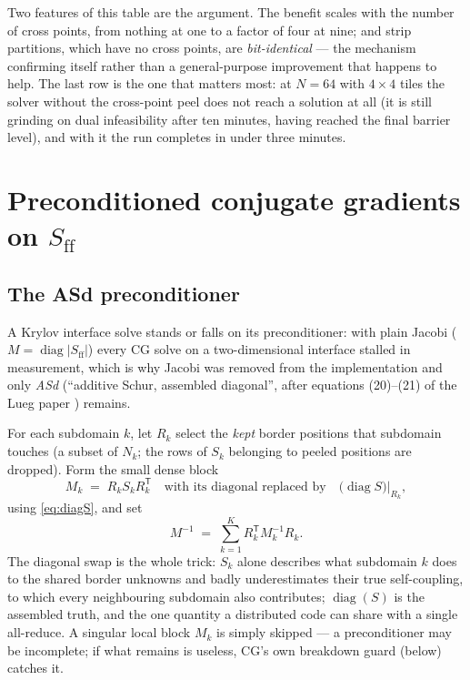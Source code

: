 \documentclass[11pt]{article}
\newcommand{\diag}{\operatorname{diag}}
\newcommand{\Sff}{S_{\mathrm{ff}}}
\begin{document}
Two features of this table are the argument.  The benefit scales with the
number of cross points, from nothing at one to a factor of four at nine; and
strip partitions, which have no cross points, are \emph{bit-identical} --- the
mechanism confirming itself rather than a general-purpose improvement that
happens to help.  The last row is the one that matters most: at $N=64$ with
$4\times4$ tiles the solver without the cross-point peel does not reach a
solution at all (it is still grinding on dual infeasibility after ten minutes,
having reached the final barrier level), and with it the run completes in
under three minutes.

\section{Preconditioned conjugate gradients on \texorpdfstring{$\Sff$}{Sff}}
\label{sec:cg}

\subsection{The ASd preconditioner}
\label{sec:precond}

A Krylov interface solve stands or falls on its preconditioner: with plain
Jacobi ($M = \diag|\Sff|$) every CG solve on a two-dimensional interface
stalled in measurement, which is why Jacobi was removed from the
implementation and only \emph{ASd} (``additive Schur, assembled diagonal'',
after equations (20)--(21) of the Lueg paper \cite{lueg2025}) remains.

For each subdomain $k$, let $R_k$ select the \emph{kept} border positions
that subdomain touches (a subset of $N_k$; the rows of $S_k$ belonging to
peeled positions are dropped).  Form the small dense block
\begin{equation}
  M_k \;=\; R_k S_k R_k^{\mathsf T}
  \quad\text{with its diagonal replaced by}\quad
  \bigl(\diag S\bigr)\big|_{R_k},
  \label{eq:asd-block}
\end{equation}
using \eqref{eq:diagS}, and set
\begin{equation}
  M^{-1} \;=\; \sum_{k=1}^{K} R_k^{\mathsf T} M_k^{-1} R_k .
  \label{eq:asd}
\end{equation}
The diagonal swap is the whole trick: $S_k$ alone describes what subdomain
$k$ does to the shared border unknowns and badly underestimates their true
self-coupling, to which every neighbouring subdomain also contributes;
$\diag(S)$ is the assembled truth, and the one quantity a distributed code
can share with a single all-reduce.  A singular local block $M_k$ is simply
skipped --- a preconditioner may be incomplete; if what remains is useless,
CG's own breakdown guard (below) catches it.
\end{document}
